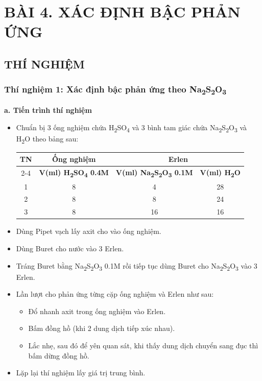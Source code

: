 \clearpage
\setcounter{section}{4}
\setcounter{subsection}{0}
\section*{\centering BÀI 4. XÁC ĐỊNH BẬC PHẢN ỨNG}
\subsection{THÍ NGHIỆM}
\subsubsection{Thí nghiệm 1: Xác định bậc phản ứng theo Na\textsubscript{2}S\textsubscript{2}O\textsubscript{3}}
\textbf{a. Tiến trình thí nghiệm}
\begin{itemize}
    \item Chuẩn bị 3 ống nghiệm chứa H\textsubscript{2}SO\textsubscript{4} và 3 bình tam giác chứa Na\textsubscript{2}S\textsubscript{2}O\textsubscript{3} và H\textsubscript{2}O theo bảng sau:
    \begin{table}[H]
        \centering
        \begin{tabular}{|c|c|c|c|}
            \hline
            \multirow{2}{*}{\textbf{TN}} & \textbf{Ống nghiệm} & \multicolumn{2}{c|}{\textbf{Erlen}} \\
            \cline{2-4}
            & \textbf{V(ml) H\textsubscript{2}SO\textsubscript{4} 0.4M} & \textbf{V(ml) Na\textsubscript{2}S\textsubscript{2}O\textsubscript{3} 0.1M} & \textbf{V(ml) H\textsubscript{2}O} \\
            \hline
            1 & 8 & 4 & 28 \\
            \hline
            2 & 8 & 8 & 24 \\
            \hline
            3 & 8 & 16 & 16 \\
            \hline
        \end{tabular}
    \end{table}
    \item Dùng Pipet vạch lấy axit cho vào ống nghiệm.
    \item Dùng Buret cho nước vào 3 Erlen.
    \item Tráng Buret bằng Na\textsubscript{2}S\textsubscript{2}O\textsubscript{3} 0.1M rồi tiếp tục dùng Buret cho Na\textsubscript{2}S\textsubscript{2}O\textsubscript{3} vào 3 Erlen.
    \item Lần lượt cho phản ứng từng cặp ống nghiệm và Erlen như sau:
    \begin{itemize}
        \item Đổ nhanh axit trong ống nghiệm vào Erlen.
        \item Bấm đồng hồ (khi 2 dung dịch tiếp xúc nhau).
        \item Lắc nhẹ, sau đó để yên quan sát, khi thấy dung dịch chuyển sang đục thì bấm dừng đồng hồ.
    \end{itemize}
    \item Lặp lại thí nghiệm lấy giá trị trung bình.
\end{itemize}

